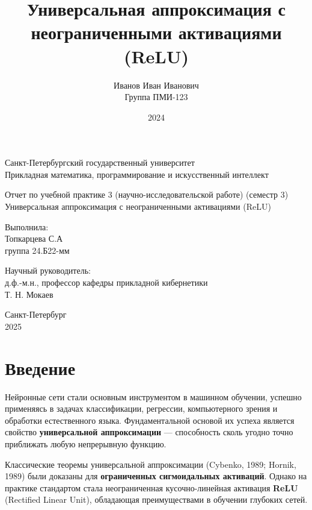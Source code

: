 \documentclass[12pt]{article}
\title{Универсальная аппроксимация с неограниченными активациями (ReLU)}
\author{Иванов Иван Иванович \\ Группа ПМИ-123}
\date{2024}
\begin{document}
	
	\begin{titlepage}
		\centering
		
		Санкт-Петербургский государственный университет \\
		Прикладная математика, программирование и искусственный интеллект \\
		
		\vspace{4cm}
		
		Отчет по учебной практике 3 (научно-исследовательской работе) (семестр 3) \\
		Универсальная аппроксимация с неограниченными активациями (ReLU) \\
		
		\vspace{4cm}
		
		\begin{flushright}
			Выполнила: \\
			Топкарцева С.А \\
			группа 24.Б22-мм \\
			
			\vspace{1cm}
			
			Научный руководитель: \\
			д.ф.-м.н., профессор кафедры прикладной кибернетики \\
			Т. Н. Мокаев \\
		\end{flushright}
		
		\vfill
		
		Санкт-Петербург \\
		2025
	\end{titlepage}
	
	\tableofcontents
	\newpage
	
	\section*{Введение}
	
	Нейронные сети стали основным инструментом в машинном обучении, успешно применяясь в задачах классификации, регрессии, компьютерного зрения и обработки естественного языка. Фундаментальной основой их успеха является свойство \textbf{универсальной аппроксимации} --- способность сколь угодно точно приближать любую непрерывную функцию.
	
	Классические теоремы универсальной аппроксимации (Cybenko, 1989; Hornik, 1989) были доказаны для \textbf{ограниченных сигмоидальных активаций}. Однако на практике стандартом стала неограниченная кусочно-линейная активация \textbf{ReLU} (Rectified Linear Unit), обладающая преимуществами в обучении глубоких сетей.
	
\end{document}
